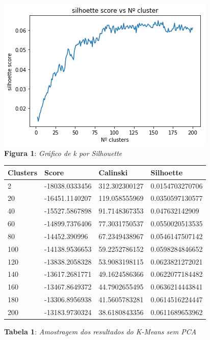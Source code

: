 \documentclass[conference]{IEEEtran}
\begin{document}
\begin{center}
\includegraphics[scale=0.5]{KmeansSemPCASilhoette.png}
\\
\textbf{Figura 1}: \textit{Gráfico de k por Silhouette}
\end{center}

\begin{center}
\begin{tabular}{| l | l | l | l |}
 \hline
 \textbf{Clusters} &   \textbf{Score} &   \textbf{Calinski} &  \textbf{Silhoette} \\ \hline
2 &   -18038.0333456 &   312.302300127 &  0.0154703270706 \\ \hline
 20 &   -16451.1140207 &   119.058555969 &  0.0350597130577 \\ \hline
 40 &   -15527.5867898 &   91.7148367353 &  0.047632142909 \\ \hline
 60 &   -14899.7376406 &   77.3031750537 &  0.0550020513535 \\ \hline
 80 &   -14452.390996 &   67.2349438967 &  0.0546147507142 \\ \hline
 100 &   -14138.9536653 &   59.2252786152 &  0.0598284846652 \\ \hline
 120 &   -13838.2058328 &   53.9083198115 &  0.0623821272021 \\ \hline
 140 &   -13617.2681771 &   49.1624586366 &  0.0622077184482 \\ \hline
 160 &   -13467.8649372 &   44.7902655495 &  0.0636214443841 \\ \hline
 180 &   -13306.8956938 &   41.5605783281 &  0.0614516224447 \\ \hline
 200 &   -13183.9730324 &   38.6180843356 &  0.0611689653962 \\ \hline
\end{tabular} \newline

\textbf{Tabela 1}: \textit{Amostragem dos resultados do K-Means sem PCA}
\end{center}
\end{document}
